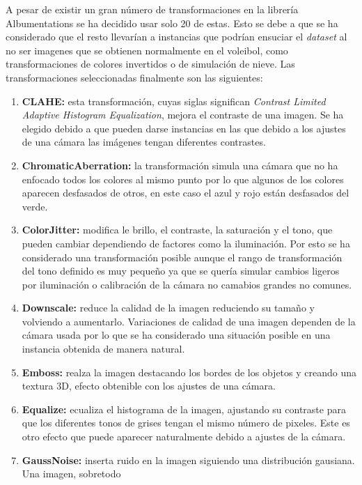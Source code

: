 \documentclass[12pt]{report} %
\begin{document}
    A pesar de existir un gran número de transformaciones en la librería Albumentations se ha decidido usar solo 
    20 de estas. Esto se debe a que se ha considerado que el resto llevarían a instancias que podrían ensuciar el 
    \textit{dataset} al no ser imagenes que se obtienen normalmente en el voleibol, como transformaciones de colores 
    invertidos o de simulación de nieve. 
    Las transformaciones seleccionadas finalmente son las siguientes:
    \begin{enumerate}
        \item \textbf{CLAHE:} esta transformación, cuyas siglas significan \textit{Contrast Limited Adaptive Histogram
         Equalization}, mejora el contraste de una imagen. Se ha elegido debido a que pueden darse instancias en las 
         que debido a los ajustes de una cámara las imágenes tengan diferentes contrastes.
        \item \textbf{ChromaticAberration:} la transformación simula una cámara que no ha enfocado todos los colores
         al mismo punto por lo que algunos de los colores aparecen desfasados de otros, en este caso el azul y rojo 
         están desfasados del verde.  
        \item \textbf{ColorJitter:} modifica le brillo, el contraste, la saturación y el tono, que pueden cambiar 
        dependiendo de factores como la iluminación. Por esto se ha considerado una transformación posible aunque el 
        rango de transformación del tono definido es muy pequeño ya que se quería simular cambios ligeros por iluminación o 
        calibración de la cámara no camabios grandes no comunes.
        \item \textbf{Downscale:} reduce la calidad de la imagen reduciendo su tamaño y volviendo a aumentarlo. 
        Variaciones de calidad de una imagen dependen de la cámara usada por lo que se ha considerado una situación 
        posible en una instancia obtenida de manera natural.
        \item \textbf{Emboss:} realza la imagen destacando los bordes de los objetos y creando una textura 3D, efecto 
        obtenible con los ajustes de una cámara.
        \item \textbf{Equalize:} ecualiza el histograma de la imagen, ajustando su contraste para que los diferentes 
        tonos de grises tengan el mismo número de pixeles. Este es otro efecto que puede aparecer naturalmente debido 
        a ajustes de la cámara.
        \item \textbf{GaussNoise:} inserta ruido en la imagen siguiendo una distribución gausiana. Una imagen, sobretodo

\end{enumerate}
\end{document}
